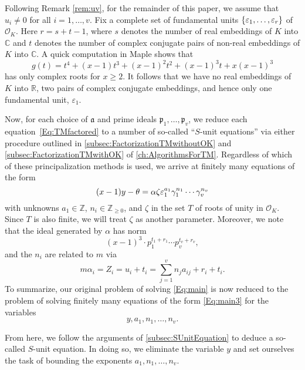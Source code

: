 Following Remark \ref{rem:uv}, for the remainder of this paper, we assume that $u_i \neq 0$ for all $i = 1, \dots, v$. Fix a complete set of fundamental units $\{\varepsilon_1, \dots, \varepsilon_r\}$ of $\mathcal{O}_K$. Here $r = s + t -1$, where $s$ denotes the number of real embeddings of $K$ into $\mathbb{C}$ and $t$ denotes the number of complex conjugate pairs of non-real embeddings of $K$ into $\mathbb{C}$. A quick computation in Maple shows that  
\[g(t) = t^4 + (x-1)t^3 + (x-1)^2t^2 + (x-1)^3t + x(x-1)^3\]
has only complex roots for $x \geq 2$. It follows that we have no real embeddings of $K$ into $\mathbb{R}$, two pairs of complex conjugate embeddings, and hence only one fundamental unit, $\varepsilon_1$. 

Now, for each choice of $\mathfrak{a}$ and prime ideals $\mathfrak{p}_1, \dots, \mathfrak{p}_v$, we reduce each equation~\eqref{Eq:TMfactored} to a number of so-called ``$S$-unit equations'' via either procedure outlined in \autoref{subsec:FactorizationTMwithoutOK} and \autoref{subsec:FactorizationTMwithOK} of \autoref{ch:AlgorithmsForTM}. Regardless of which of these principalization methods is used, we arrive at finitely many equations of the form
\begin{equation} \label{Eq:main2}
(x-1)y - \theta = \alpha \zeta \varepsilon_1^{a_1}\gamma_1^{n_1}\cdots \gamma_v^{n_v}
\end{equation}
with unknowns $a_1 \in \mathbb{Z}$, $n_i \in \mathbb{Z}_{\geq 0}$, and $\zeta$ in the set $T$ of roots of unity in $\mathcal{O}_K$. Since $T$ is also finite, we will treat $\zeta$ as another parameter. Moreover, we note that the ideal generated by $\alpha$ has norm
\begin{equation} \label{Eq:main3}
(x-1)^3\cdot p_1^{t_1 + r_1} \cdots p_v^{t_v + r_v},
\end{equation}
and the $n_i$ are related to $m$ via
\[m \alpha_i = Z_i = u_i + t_i = \sum_{j = 1}^{v}n_ja_{ij} + r_i + t_i.\]
To summarize, our original problem of solving \eqref{Eq:main} is now reduced to the problem of solving finitely many equations of the form \eqref{Eq:main3} for the variables 
\[y, a_1, n_1, \dots, n_v.\] 

From here, we follow the arguments of \autoref{subsec:SUnitEquation} to deduce a so-called $S$-unit equation. In doing so, we eliminate the variable $y$ and set ourselves the task of bounding the exponents $a_1, n_1, \dots, n_v$. 

